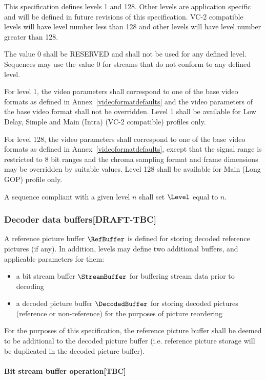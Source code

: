 This specification defines levels 1 and 128. Other levels are application 
specific and will be defined in future revisions of this specification. VC-2
compatible levels will have level number less than 128 and other levels
will have level number greater than 128.

The value 0 shall be RESERVED and shall not be used for any defined level. 
Sequences may use the value 0 for streams that do not conform to any defined level. 

For level 1, the video parameters shall correspond 
to one of the base video formats as defined in Annex~\ref{videoformatdefaults}
and the video parameters
of the base video format shall not be overridden. Level 1 shall be available
for Low Delay, Simple and Main (Intra) (VC-2 compatible) profiles only.

For level 128, the video parameters shall correspond to one of the base video
formats as defined in Annex~\ref{videoformatdefaults},
except that the signal range is restricted
to 8 bit ranges and the chroma sampling format and frame dimensions may be
overridden by suitable values. Level 128 shall be available for Main (Long GOP)
profile only.

A sequence compliant with a given level $n$ shall set $\Level$ equal to $n$.

\subsubsection{Decoder data buffers[DRAFT-TBC]}

A reference picture buffer $\RefBuffer$ is defined for storing 
decoded reference pictures (if any). In addition, levels may define
two additional buffers, and applicable parameters for them:

\begin{itemize}
\item a bit stream buffer $\StreamBuffer$ for buffering 
stream data prior to decoding
\item a decoded picture buffer $\DecodedBuffer$ for storing 
decoded pictures (reference or non-reference) for the purposes
of picture reordering
\end{itemize}

For the purposes of this specification, the reference picture 
buffer shall be deemed to be additional to the
decoded picture buffer (i.e. reference picture storage will be
duplicated in the decoded picture buffer).

\paragraph{Bit stream buffer operation[TBC]}$\ $\newline

